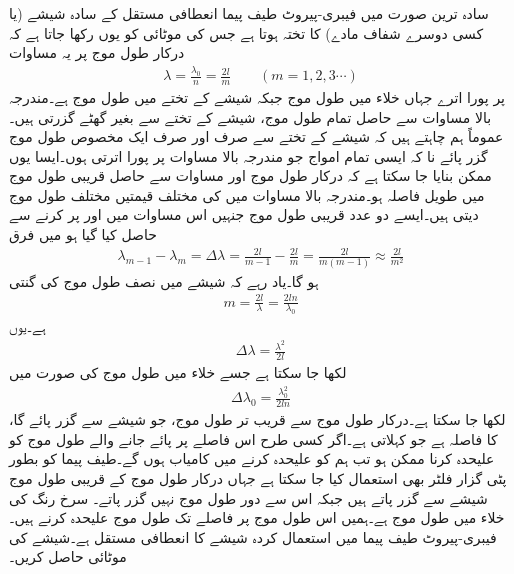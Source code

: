 سادہ ترین صورت میں فیبری-پیروٹ طیف پیما  انعطافی مستقل کے  سادہ شیشے (یا کسی دوسرے شفاف مادے) کا تختہ ہوتا ہے جس کی موٹائی  کو یوں رکھا جاتا ہے کہ درکار طول موج پر یہ مساوات 
\begin{align}\label{مساوات_مستوی_فیبری_پیروٹ_الف}
\lambda=\frac{\lambda_0}{n}=\frac{2l}{m} \quad \quad (m=1,2,3\cdots)
\end{align}
 پر پورا اترے جہاں خلاء میں طول موج  جبکہ شیشے کے تختے میں طول موج  ہے۔مندرجہ بالا مساوات سے حاصل تمام طول موج، شیشے کے تختے سے بغیر گھٹے گزرتی ہیں۔عموماً ہم چاہتے ہیں کہ شیشے کے تختے سے صرف اور صرف ایک مخصوص طول موج گزر پائے نا کہ ایسی تمام امواج جو مندرجہ بالا مساوات پر پورا اترتی ہوں۔ایسا یوں ممکن بنایا جا سکتا ہے کہ درکار طول موج اور مساوات  سے حاصل قریبی طول موج میں طویل فاصلہ ہو۔مندرجہ بالا مساوات میں  کی مختلف قیمتیں مختلف طول موج دیتی ہیں۔ایسے دو عدد قریبی طول موج جنہیں اس مساوات میں   اور  پر کرنے سے حاصل کیا گیا ہو میں فرق 
\begin{align}
\lambda_{m-1}-\lambda_m=\Delta \lambda=\frac{2l}{m-1}-\frac{2l}{m}=\frac{2l}{m(m-1)} \approx \frac{2l}{m^2}
\end{align}
ہو گا۔یاد رہے کہ  شیشے میں نصف طول موج کی گنتی
\begin{align}
m=\frac{2l}{\lambda}=\frac{2ln}{\lambda_0}
\end{align}
ہے۔یوں
\begin{align}
\Delta \lambda=\frac{\lambda^2}{2l}
\end{align}
لکھا جا سکتا ہے جسے خلاء میں طول موج  کی صورت میں
\begin{align}
\Delta \lambda_0=\frac{\lambda_0^2}{2ln}
\end{align}
لکھا جا سکتا ہے۔درکار طول موج  سے قریب تر طول موج، جو شیشے سے گزر پائے گا، کا فاصلہ  ہے جو  کہلاتی ہے۔اگر کسی طرح اس فاصلے پر پائے جانے والے  طول موج کو علیحدہ کرنا ممکن ہو تب ہم  کو علیحدہ کرنے میں کامیاب ہوں گے۔طیف پیما کو بطور پٹی گزار فلٹر بھی استعمال کیا جا سکتا ہے جہاں درکار طول موج کے قریبی طول موج شیشے سے گزر پاتے ہیں جبکہ اس سے دور طول موج نہیں گزر پاتے۔
سرخ رنگ کی خلاء میں طول موج  ہے۔ہمیں اس طول موج پر  فاصلے تک طول موج علیحدہ کرنے ہیں۔فیبری-پیروٹ طیف پیما میں استعمال کردہ شیشے کا انعطافی مستقل  ہے۔شیشے کی موٹائی حاصل کریں۔


